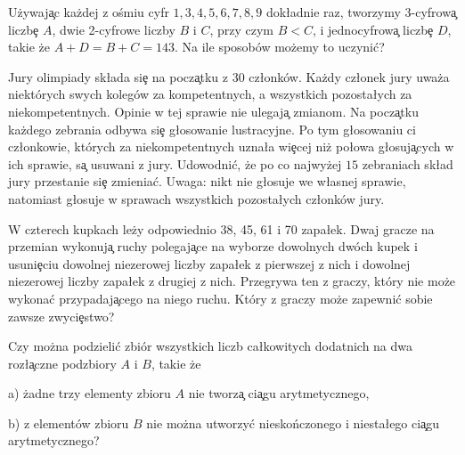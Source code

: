 \prob   %
U\.zywaj\c ac ka\.zdej z o\'smiu cyfr $1,3,4,5,6,7,8,9$ dok\l adnie
raz, tworzymy 3-cyfrow\c a liczb\c e $A$, dwie 2-cyfrowe liczby $B$ i
$C$, przy czym $B<C$, i jednocyfrow\c a liczb\c e $D$, takie \.ze
$A+D=B+C=143$. Na ile sposob\'ow mo\.zemy to uczyni\'c?

            



\prob %
Jury olimpiady sk\l ada si\c e na pocz\c atku z 30 cz\l onk\'ow. 
Ka\.zdy cz\l onek jury uwa\.za niekt\'orych swych koleg\'ow za
kompetentnych, a wszystkich pozosta\l ych za niekompetentnych. 
Opinie w tej sprawie nie ulegaj\c a zmianom. Na pocz\c atku ka\.zdego
zebrania odbywa si\c e g\l osowanie lustracyjne. Po tym 
g\l osowaniu ci cz\l onkowie, kt\'orych za niekompetentnych
uzna\l a wi\c ecej ni\.z po\l owa g\l osuj\c acych w ich sprawie, s\c a usuwani z
jury. 
Udowodni\'c, \.ze po co najwy\.zej $15$ zebraniach
sk\l ad jury przestanie si\c e zmienia\'c. Uwaga: nikt nie g\l osuje
we w\l asnej sprawie, natomiast g\l osuje w sprawach wszystkich
pozosta\l ych cz\l onk\'ow jury.



\prob %
W czterech kupkach le\.zy odpowiednio  38, 45, 61 i 70  zapa\l ek.
Dwaj gracze na przemian wykonuj\c a ruchy polegaj\c ace na wyborze 
dowolnych dw\'och  kupek i usuni\c eciu dowolnej niezerowej liczby
zapa\l ek z pierwszej z nich i dowolnej niezerowej liczby zapa\l ek z
drugiej z nich. Przegrywa ten z graczy, kt\'ory nie mo\.ze wykona\'c
przypadaj\c acego na niego ruchu. Kt\'ory z graczy mo\.ze zapewni\'c
sobie zawsze zwyci\c estwo?


                                                                      
                                                                      
                                             
            




\prob %
Czy mo\.zna podzieli\'c zbi\'or wszystkich liczb ca\l kowitych
dodatnich na dwa roz\l\c a\-czne podzbiory $A$ i $B$, takie \.ze
          
\item{a)} \.zadne trzy elementy zbioru $A$ nie 
tworz\c a ci\c agu arytmetycznego,

\item{b)} z element\'ow zbioru $B$ nie mo\.zna utworzy\'c
niesko\'nczonego i niesta\l ego ci\c agu arytmetycznego?
                                         


\bye


